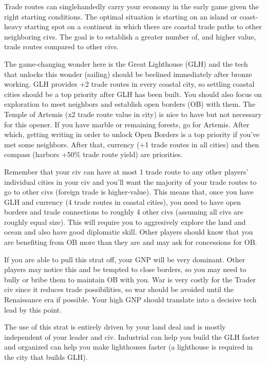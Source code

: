 \documentclass[10pt]{article}
\begin{document}
Trade routes can singlehandedly carry your economy in the early game given the right starting conditions.
The optimal situation is starting on an island or coast-heavy starting spot on a continent in which there are coastal trade
paths to other neighboring civs. The goal is to establish a greater number of, and higher value, trade routes
compared to other civs.

The game-changing wonder here is the Great Lighthouse (GLH) and the
tech that unlocks this wonder (sailing) should be beelined immediately after bronze working. GLH provides
+2 trade routes in every coastal city, so settling coastal cities should be a top priority after GLH has
been built. You should also focus on exploration to meet neighbors and establish open borders (OB) with them.
The Temple of Artemis (x2 trade route value in city) is nice to have but not necessary for this opener.
If you have marble or remaining forests, go for Artemis. After which, getting writing in order to unlock Open
Borders is a top priority if you've met some neighbors. After that, currency (+1 trade routes in all cities) and
then compass (harbors +50\% trade route yield) are priorities.

Remember that your civ can have at most 1 trade route to any other players' individual cities in your civ and you'll want the
majority of your trade routes to go to other civs (foreign trade is higher-value). This means that, once you have GLH
and currency (4 trade routes in coastal cities), you need to have open borders and trade connections to roughly 4
other civs (assuming all civs are roughly equal size). This will require you to aggresively explore the land and ocean
and also have good diplomatic skill. Other players should know that you are benefiting from OB more than they are
and may ask for concessions for OB.

If you are able to pull this strat off, your GNP will be very dominant. Other players may notice this and be tempted to
close borders, so you may need to bully or bribe them to maintain OB with you. War is very costly for the Trader civ since
it reduces trade possibilities, so war should be avoided until the Renaissance era if possible. Your high GNP should translate
into a decisive tech lead by this point.

The use of this strat is entirely driven by your land deal and is mostly independent of your leader and civ. Industrial
can help you build the GLH faster and organized can help you make lighthouses faster (a lighthouse is required in the
city that builds GLH).
\end{document}
